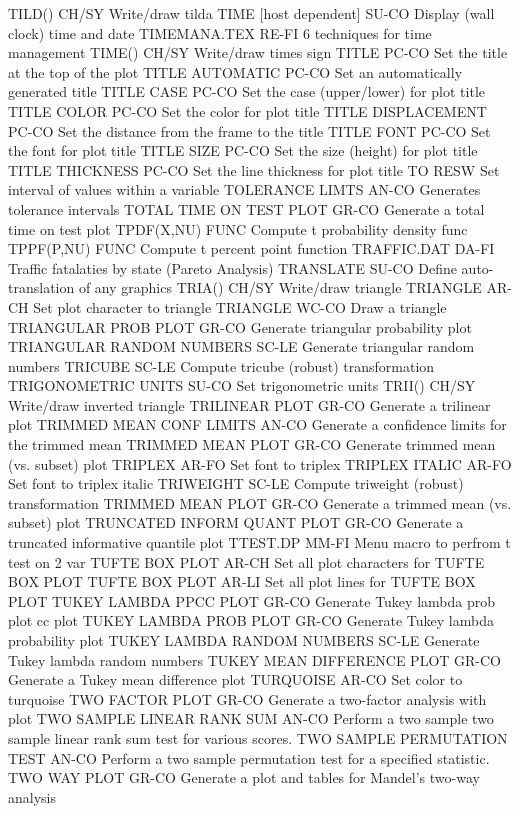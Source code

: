 TILD()                      CH/SY Write/draw tilda
TIME  [host dependent]      SU-CO Display (wall clock) time and date
TIMEMANA.TEX                RE-FI 6 techniques for time management
TIME()                      CH/SY Write/draw times sign
TITLE                       PC-CO Set the title at the top of the plot
TITLE AUTOMATIC             PC-CO Set an automatically generated title
TITLE CASE                  PC-CO Set the case (upper/lower) for plot title
TITLE COLOR                 PC-CO Set the color for plot title
TITLE DISPLACEMENT          PC-CO Set the distance from the frame to the title
TITLE FONT                  PC-CO Set the font for plot title
TITLE SIZE                  PC-CO Set the size (height) for plot title
TITLE THICKNESS             PC-CO Set the line thickness for plot title
TO                          RESW  Set interval of values within a variable
TOLERANCE LIMTS             AN-CO Generates tolerance intervals
TOTAL TIME ON TEST PLOT     GR-CO Generate a total time on test plot
TPDF(X,NU)                  FUNC  Compute t probability density func
TPPF(P,NU)                  FUNC  Compute t percent point function
TRAFFIC.DAT                 DA-FI Traffic fatalaties by state (Pareto Analysis)
TRANSLATE                   SU-CO Define auto-translation of any graphics
TRIA()                      CH/SY Write/draw triangle
TRIANGLE                    AR-CH Set plot character to triangle
TRIANGLE                    WC-CO Draw a triangle
TRIANGULAR PROB PLOT        GR-CO Generate triangular probability plot
TRIANGULAR RANDOM NUMBERS   SC-LE Generate triangular random numbers
TRICUBE                     SC-LE Compute tricube (robust) transformation
TRIGONOMETRIC UNITS         SU-CO Set trigonometric units
TRII()                      CH/SY Write/draw inverted triangle
TRILINEAR PLOT              GR-CO Generate a trilinear plot
TRIMMED MEAN CONF LIMITS    AN-CO Generate a confidence limits for the trimmed mean
TRIMMED MEAN PLOT           GR-CO Generate trimmed mean (vs. subset) plot
TRIPLEX                     AR-FO Set font to triplex
TRIPLEX ITALIC              AR-FO Set font to triplex italic
TRIWEIGHT                   SC-LE Compute triweight (robust) transformation
TRIMMED MEAN PLOT           GR-CO Generate a trimmed mean (vs. subset) plot
TRUNCATED INFORM QUANT PLOT GR-CO Generate a truncated informative quantile plot
TTEST.DP                    MM-FI Menu macro to perfrom t test on 2 var
TUFTE BOX PLOT              AR-CH Set all plot characters for TUFTE BOX PLOT
TUFTE BOX PLOT              AR-LI Set all plot lines for TUFTE BOX PLOT
TUKEY LAMBDA PPCC PLOT      GR-CO Generate Tukey lambda prob plot cc plot
TUKEY LAMBDA PROB PLOT      GR-CO Generate Tukey lambda probability plot
TUKEY LAMBDA RANDOM NUMBERS SC-LE Generate Tukey lambda random numbers
TUKEY MEAN DIFFERENCE PLOT  GR-CO Generate a Tukey mean difference plot
TURQUOISE                   AR-CO Set color to turquoise
TWO FACTOR PLOT             GR-CO Generate a two-factor analysis with plot
TWO SAMPLE LINEAR RANK SUM  AN-CO Perform a two sample two sample linear rank sum test for various scores.
TWO SAMPLE PERMUTATION TEST AN-CO Perform a two sample permutation test for a specified statistic.
TWO WAY PLOT                GR-CO Generate a plot and tables for Mandel's two-way analysis

